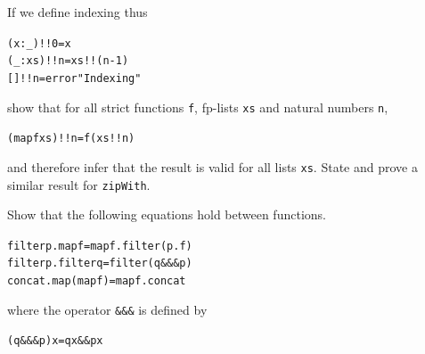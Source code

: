 \begin{exercises}
\item
If we define indexing thus
\begin{alltt}
(x:_)!!0  = x
(_:xs)!!n = xs!!(n-1)
[]!!n     = error "Indexing"
\end{alltt}
show that for all strict functions \texttt{f}, fp-lists \texttt{xs} and natural numbers \texttt{n},
\begin{alltt}
(map f xs)!!n = f (xs!!n)
\end{alltt}
and therefore infer that the result is valid for all lists \texttt{xs}.
State and prove a similar result for \texttt{zipWith}.

\item
Show that the following equations hold between functions.
\begin{alltt}
filter p . map f     = map f . filter (p . f)
filter p . filter q  = filter (q \&\&\& p)
concat . map (map f) = map f . concat      
\end{alltt}
where the operator \texttt{\&\&\&} is defined by
\begin{alltt}
(q \&\&\& p) x = q x \&\& p x
\end{alltt}
\end{exercises}

